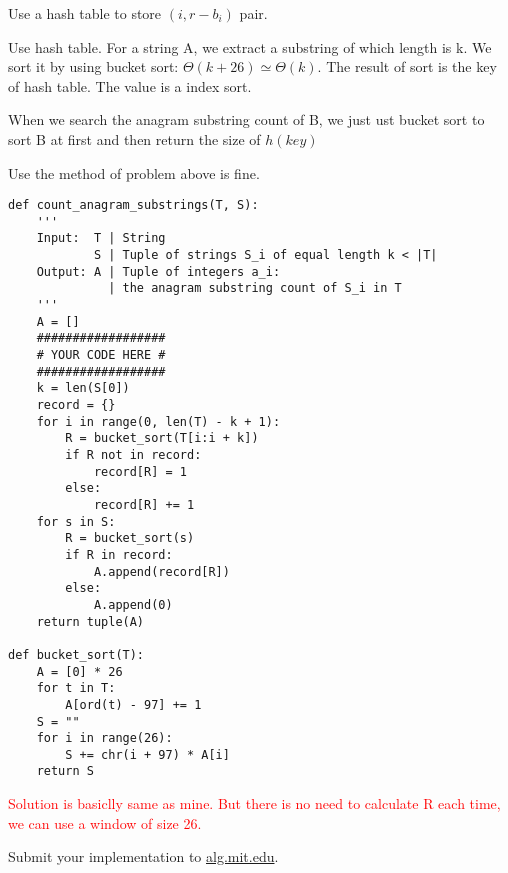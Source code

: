 \documentclass[12pt,twoside]{article}
\begin{document}
\begin{problems}
\begin{problemparts}
\end{problemparts}

\problem  %

\begin{problemparts}
\problempart %
Use a hash table to store $(i, r - b_i)$ pair.

\problempart %
\end{problemparts}

\problem  %

\begin{problemparts}
\problempart %
Use hash table. For a string A, we extract a substring of which length is k. We sort it
by using bucket sort: $\Theta(k+26)\simeq \Theta(k)$. The result of sort is the key of 
hash table. The value is a index sort.

When we search the anagram substring count of B, we just ust bucket sort to sort B at first
and then return the size of $h(key)$

\problempart %
Use the method of problem above is fine.
\begin{lstlisting}
def count_anagram_substrings(T, S):
    '''
    Input:  T | String
            S | Tuple of strings S_i of equal length k < |T|
    Output: A | Tuple of integers a_i:
              | the anagram substring count of S_i in T
    '''
    A = []
    ##################
    # YOUR CODE HERE #
    ##################
    k = len(S[0])
    record = {}
    for i in range(0, len(T) - k + 1):
        R = bucket_sort(T[i:i + k])
        if R not in record:
            record[R] = 1
        else:
            record[R] += 1
    for s in S:
        R = bucket_sort(s)
        if R in record:
            A.append(record[R])
        else:
            A.append(0)
    return tuple(A)

def bucket_sort(T):
    A = [0] * 26
    for t in T:
        A[ord(t) - 97] += 1
    S = ""
    for i in range(26):
        S += chr(i + 97) * A[i]
    return S
\end{lstlisting}
\textcolor{red}{Solution is basiclly same as mine. But there is no need to calculate R each time,
we can use a window of size 26.}


\problempart Submit your implementation to {\small\url{alg.mit.edu}}.
\end{problemparts}

\end{problems}
\end{document}
